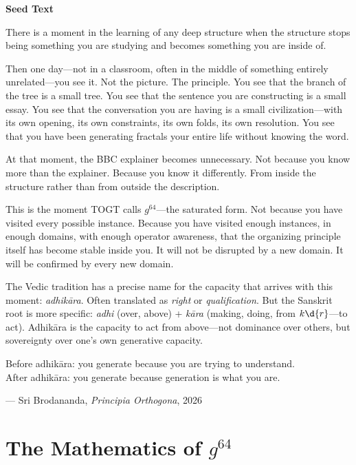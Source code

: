 \documentclass[11pt, twoside, openright]{book}
\theoremstyle{plain}
\theoremstyle{definition}
\newenvironment{seedbox}{%
  \begin{mdframed}[backgroundcolor=SeedBox,linecolor=PrincipiaDark!60,linewidth=0.5pt,innertopmargin=6pt,innerbottommargin=6pt]
  \noindent\textbf{Seed Text}\par\medskip}{\end{mdframed}}
\begin{document}
\begin{seedbox}
There is a moment in the learning of any deep structure when the
structure stops being something you are studying and becomes something
you are inside of.

Then one day---not in a classroom, often in the middle of something
entirely unrelated---you see it. Not the picture. The principle. You
see that the branch of the tree is a small tree. You see that the
sentence you are constructing is a small essay. You see that the
conversation you are having is a small civilization---with its own
opening, its own constraints, its own folds, its own resolution. You
see that you have been generating fractals your entire life without
knowing the word.

At that moment, the BBC explainer becomes unnecessary. Not because you
know more than the explainer. Because you know it differently.
From inside the structure rather than from outside the description.

This is the moment TOGT calls $g^{64}$---the saturated form. Not because
you have visited every possible instance. Because you have visited enough
instances, in enough domains, with enough operator awareness, that the
organizing principle itself has become stable inside you. It will not
be disrupted by a new domain. It will be confirmed by every new domain.

The Vedic tradition has a precise name for the capacity that arrives
with this moment: \textit{adhik\={a}ra}. Often translated as \textit{right} or
\textit{qualification}. But the Sanskrit root is more specific:
\textit{adhi} (over, above) + \textit{k\={a}ra} (making, doing, from $k\d{r}$---to act).
Adhik\={a}ra is the capacity to act from above---not dominance over others,
but sovereignty over one's own generative capacity.

Before adhik\={a}ra: you generate because you are trying to understand.\\
After adhik\={a}ra: you generate because generation is what you are.

\begin{flushright}
--- Sri Brodananda, \textit{Principia Orthogona}, 2026
\end{flushright}
\end{seedbox}

\section{The Mathematics of $g^{64}$}
\end{document}
